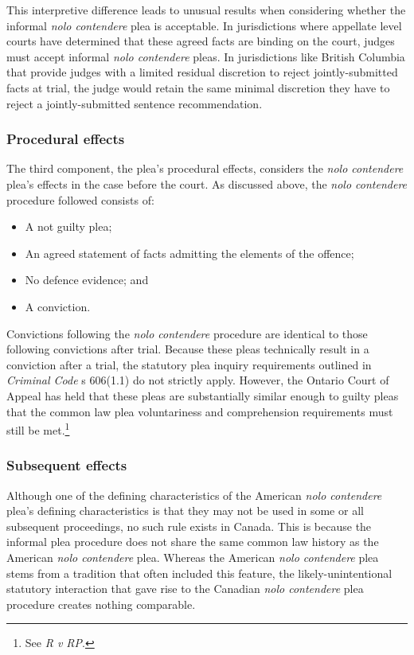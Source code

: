 This interpretive difference leads to unusual results when considering whether the informal \textit{nolo contendere} plea is acceptable. In jurisdictions where appellate level courts have determined that these agreed facts are binding on the court, judges must accept informal \textit{nolo contendere} pleas. In jurisdictions like British Columbia that provide judges with a limited residual discretion to reject jointly-submitted facts at trial, the judge would retain the same minimal discretion they have to reject a jointly-submitted sentence recommendation.

\subsubsection{Procedural effects}

The third component, the plea's procedural effects, considers the \textit{nolo contendere} plea's effects in the case before the court. As discussed above, the \textit{nolo contendere} procedure followed consists of:

\begin{itemize}
    \item A not guilty plea;
    \item An agreed statement of facts admitting the elements of the offence;
    \item No defence evidence; and
    \item A conviction.
\end{itemize}

Convictions following the \textit{nolo contendere} procedure are identical to those following convictions after trial. Because these pleas technically result in a conviction after a trial, the statutory plea inquiry requirements outlined in \textit{Criminal Code} s 606(1.1) do not strictly apply. However, the Ontario Court of Appeal has held that these pleas are substantially similar enough to guilty pleas that the common law plea voluntariness and comprehension requirements must still be met.\footnote{See \textit{R v RP}.}

\subsubsection{Subsequent effects}

Although one of the defining characteristics of the American \textit{nolo contendere} plea's defining characteristics is that they may not be used in some or all subsequent proceedings, no such rule exists in Canada. This is because the informal plea procedure does not share the same common law history as the American \textit{nolo contendere} plea. Whereas the American \textit{nolo contendere} plea stems from a tradition that often included this feature, the likely-unintentional statutory interaction that gave rise to the Canadian \textit{nolo contendere} plea procedure creates nothing comparable. 

